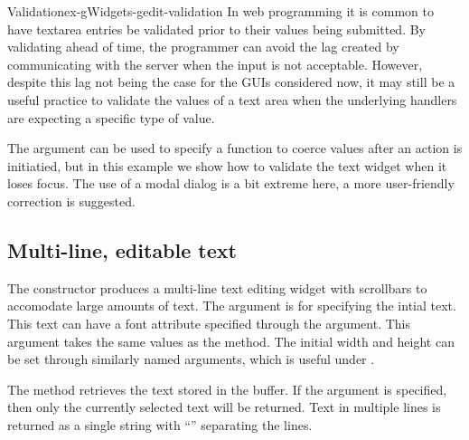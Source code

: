 \begin{example}{Validation}{ex-gWidgets-gedit-validation}
In web programming it is common to have textarea entries be validated
prior to their values being submitted. By validating ahead of time,
the programmer can avoid the lag created by communicating with the
server when the input is not acceptable. However, despite
this lag not being the case for the GUIs considered now, it may still be a
useful practice to validate the values of a text area when the
underlying handlers are expecting a specific type of value.
  
The  argument can be used to specify a function
to coerce values after an action is initiatied, but in this example we
show how to validate the text widget when it loses focus. The use of a
modal dialog is a bit extreme here, a more user-friendly correction
is suggested.


\begin{Schunk}
\end{Schunk}
\end{example}

\subsection{Multi-line, editable text}
\label{sec:gWidgets-multi-line-editable}

The  constructor produces a multi-line text editing
widget with scrollbars to accomodate large amounts of text. The
 argument is for specifying the intial
text. This text can have a font attribute specified through the
 argument. This argument takes the same
values as the  method. The initial width and height can be
set through similarly named arguments, which is useful under
. 

The  method retrieves the text stored in the buffer. If the
argument  is specified, then only the currently
selected text will be returned. Text in multiple lines is returned
as a single string with ``\backslashn'' separating the lines.

